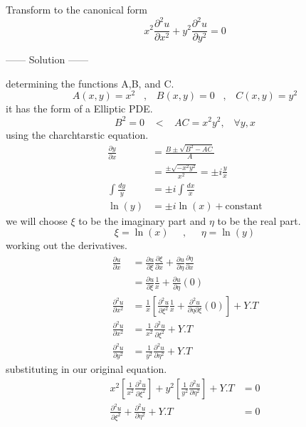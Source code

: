 \documentclass[]{article}
\begin{document}
\begin{example}
    Transform to the canonical form
    \[
        x^2\frac{\partial^2 u}{\partial x^2}+y^2\frac{\partial^2 u}{\partial y^2} = 0  
    \]
    \begin{center}
        ------ \textcolor{Solution}{Solution} ------ 
    \end{center}
    determining the functions A,B, and C.
    \[
        A\left(x,y\right)=x^2 \;\;\;,\;\;\; B\left(x,y\right)=0 \;\;\;,\;\;\; C\left(x,y\right)=y^2    
    \]
    it has the form of a Elliptic PDE.
    \[
        B^2 =0 \;\;\;<\;\;\; AC=x^2 y^{2}, \;\;\;\forall y, x  
    \]
    using the charchtarstic equation.
    \begin{align*}
        \frac{\partial y}{\partial x} &= \frac{B\pm\sqrt{B^2 -AC}}{A}
        \\
        &= \frac{\pm\sqrt{-x^2 y^2}}{x^2}=\pm i\frac{y}{x}
        \\
        \int\frac{dy}{y} &= \pm i\int\frac{dx}{x}
        \\
        \ln\left(y\right) &= \pm i \ln\left(x\right)+\text{constant}
    \end{align*}
    we will choose $\xi$ to be the imaginary part and $\eta$ to be the real part.
    \[
        \xi = \ln\left(x\right) \;\;\;\;\; , \;\;\;\;\; \eta = \ln\left(y\right)    
    \]
    working out the derivatives.
    \begin{align*}
        \frac{\partial u}{\partial x} &= \frac{\partial u}{\partial\xi}\frac{\partial\xi}{\partial x} + \frac{\partial u }{\partial\eta}\frac{\partial\eta}{\partial x}
        \\
        &= \frac{\partial u}{\partial\xi}\frac{1}{x}+\frac{\partial u}{\partial\eta}\left(0\right)
        \\
        \frac{\partial^2 u}{\partial x^2} &= \frac{1}{x}\left[\frac{\partial^2 u}{\partial\xi^2}\frac{1}{x}+\frac{\partial^2 u}{\partial\eta\partial\xi}\left(0\right)\right] + Y.T
        \\
        \frac{\partial^2 u}{\partial x^2} &=\frac{1}{x^2}\frac{\partial^2 u}{\partial\xi^2}+Y.T
        \\
        \frac{\partial^2 u}{\partial y^2} &=\frac{1}{y^2}\frac{\partial^2 u}{\partial\eta^2}+Y.T
    \end{align*}
    substituting in our original equation.
    \begin{align*}
        x^2\left[\frac{1}{x^2}\frac{\partial^2 u}{\partial\xi^2}\right]+y^2\left[\frac{1}{y^2}\frac{\partial^2 u}{\partial\eta^2}\right]+Y.T &= 0
        \\
        \frac{\partial^2 u}{\partial\xi^2}+\frac{\partial^2 u}{\partial\eta^2}+Y.T &=0
    \end{align*}
\end{example}
\end{document}
